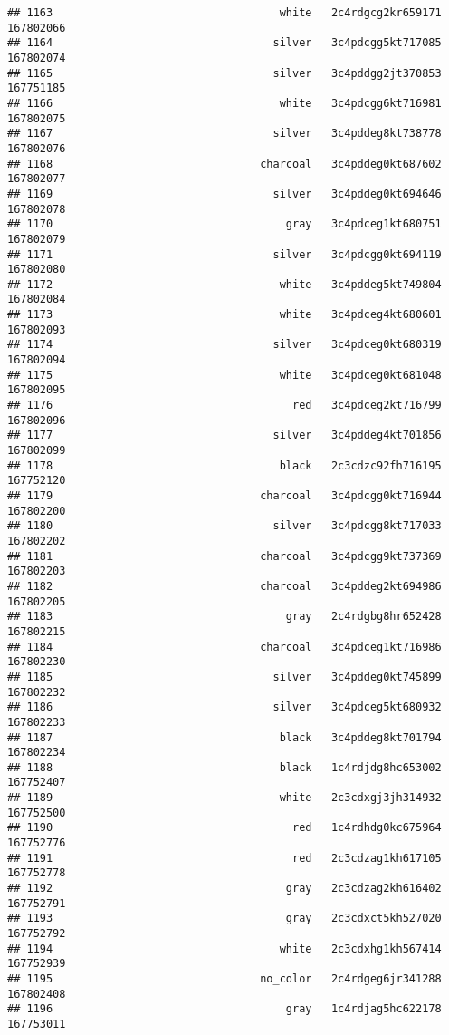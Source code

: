 \documentclass[
]{article}
\begin{document}
\begin{verbatim}
## 1163                                   white   2c4rdgcg2kr659171 167802066
## 1164                                  silver   3c4pdcgg5kt717085 167802074
## 1165                                  silver   3c4pddgg2jt370853 167751185
## 1166                                   white   3c4pdcgg6kt716981 167802075
## 1167                                  silver   3c4pddeg8kt738778 167802076
## 1168                                charcoal   3c4pddeg0kt687602 167802077
## 1169                                  silver   3c4pddeg0kt694646 167802078
## 1170                                    gray   3c4pdceg1kt680751 167802079
## 1171                                  silver   3c4pdcgg0kt694119 167802080
## 1172                                   white   3c4pddeg5kt749804 167802084
## 1173                                   white   3c4pdceg4kt680601 167802093
## 1174                                  silver   3c4pdceg0kt680319 167802094
## 1175                                   white   3c4pdceg0kt681048 167802095
## 1176                                     red   3c4pdceg2kt716799 167802096
## 1177                                  silver   3c4pddeg4kt701856 167802099
## 1178                                   black   2c3cdzc92fh716195 167752120
## 1179                                charcoal   3c4pdcgg0kt716944 167802200
## 1180                                  silver   3c4pdcgg8kt717033 167802202
## 1181                                charcoal   3c4pdcgg9kt737369 167802203
## 1182                                charcoal   3c4pddeg2kt694986 167802205
## 1183                                    gray   2c4rdgbg8hr652428 167802215
## 1184                                charcoal   3c4pdceg1kt716986 167802230
## 1185                                  silver   3c4pddeg0kt745899 167802232
## 1186                                  silver   3c4pdceg5kt680932 167802233
## 1187                                   black   3c4pddeg8kt701794 167802234
## 1188                                   black   1c4rdjdg8hc653002 167752407
## 1189                                   white   2c3cdxgj3jh314932 167752500
## 1190                                     red   1c4rdhdg0kc675964 167752776
## 1191                                     red   2c3cdzag1kh617105 167752778
## 1192                                    gray   2c3cdzag2kh616402 167752791
## 1193                                    gray   2c3cdxct5kh527020 167752792
## 1194                                   white   2c3cdxhg1kh567414 167752939
## 1195                                no_color   2c4rdgeg6jr341288 167802408
## 1196                                    gray   1c4rdjag5hc622178 167753011

\end{verbatim}
\end{document}
